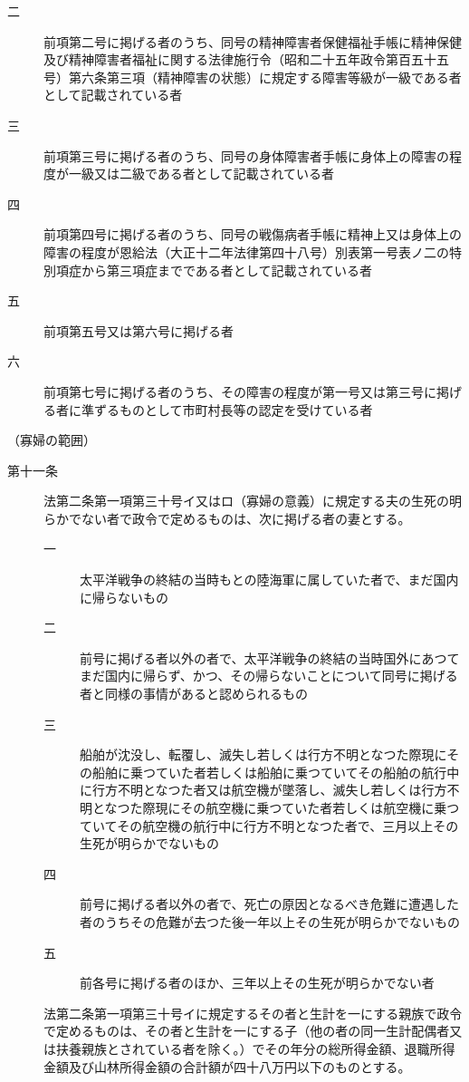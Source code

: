 \documentclass[twocolumn,a4j,10pt]{ltjtarticle}
\begin{document}
\begin{description}
\begin{description}
\item[二]前項第二号に掲げる者のうち、同号の精神障害者保健福祉手帳に精神保健及び精神障害者福祉に関する法律施行令（昭和二十五年政令第百五十五号）第六条第三項（精神障害の状態）に規定する障害等級が一級である者として記載されている者
\item[三]前項第三号に掲げる者のうち、同号の身体障害者手帳に身体上の障害の程度が一級又は二級である者として記載されている者
\item[四]前項第四号に掲げる者のうち、同号の戦傷病者手帳に精神上又は身体上の障害の程度が恩給法（大正十二年法律第四十八号）別表第一号表ノ二の特別項症から第三項症までである者として記載されている者
\item[五]前項第五号又は第六号に掲げる者
\item[六]前項第七号に掲げる者のうち、その障害の程度が第一号又は第三号に掲げる者に準ずるものとして市町村長等の認定を受けている者
\end{description}
\end{description}
\noindent\hspace{10pt}（寡婦の範囲）
\begin{description}
\item[第十一条]法第二条第一項第三十号イ又はロ（寡婦の意義）に規定する夫の生死の明らかでない者で政令で定めるものは、次に掲げる者の妻とする。
\begin{description}
\item[一]太平洋戦争の終結の当時もとの陸海軍に属していた者で、まだ国内に帰らないもの
\item[二]前号に掲げる者以外の者で、太平洋戦争の終結の当時国外にあつてまだ国内に帰らず、かつ、その帰らないことについて同号に掲げる者と同様の事情があると認められるもの
\item[三]船舶が沈没し、転覆し、滅失し若しくは行方不明となつた際現にその船舶に乗つていた者若しくは船舶に乗つていてその船舶の航行中に行方不明となつた者又は航空機が墜落し、滅失し若しくは行方不明となつた際現にその航空機に乗つていた者若しくは航空機に乗つていてその航空機の航行中に行方不明となつた者で、三月以上その生死が明らかでないもの
\item[四]前号に掲げる者以外の者で、死亡の原因となるべき危難に遭遇した者のうちその危難が去つた後一年以上その生死が明らかでないもの
\item[五]前各号に掲げる者のほか、三年以上その生死が明らかでない者
\end{description}
\item[]法第二条第一項第三十号イに規定するその者と生計を一にする親族で政令で定めるものは、その者と生計を一にする子（他の者の同一生計配偶者又は扶養親族とされている者を除く。）でその年分の総所得金額、退職所得金額及び山林所得金額の合計額が四十八万円以下のものとする。
\end{description}
\end{document}
